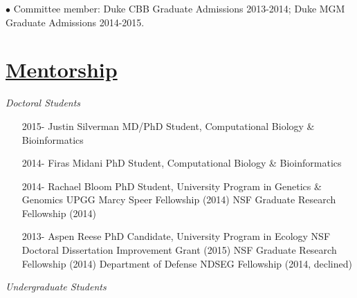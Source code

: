 \documentclass[overlapped,line,11pt]{res}
\begin{document}
\begin{resume}
\vspace{-10mm}
\hangindent=0.5in $\bullet$\hspace{.1in} Committee member: Duke CBB
Graduate Admissions 2013-2014; Duke MGM Graduate Admissions 2014-2015.


\section{\underline{\sc Mentorship}}
\vspace{.1in}
\emph{Doctoral Students}
\vspace{.1in}

\begin{itemize}[leftmargin=2cm, style=sameline, itemsep=0mm]

\item[2015-] Justin Silverman \newline 
  MD/PhD Student, Computational Biology \& Bioinformatics
\item[2014-] Firas Midani \newline 
  PhD Student, Computational Biology \& Bioinformatics
\item[2014-] Rachael Bloom \newline 
  PhD Student, University Program in Genetics \& Genomics \newline
  UPGG Marcy Speer Fellowship (2014) \newline
  NSF Graduate Research Fellowship (2014)
\item[2013-] Aspen Reese \newline 
  PhD Candidate, University Program in Ecology \newline
  NSF Doctoral Dissertation Improvement Grant (2015) \newline
  NSF Graduate Research Fellowship (2014) \newline
  Department of Defense NDSEG Fellowship (2014, declined)

\end{itemize}

\emph{Undergraduate Students}
\vspace{.1in}
\begin{itemize}[leftmargin=2cm, style=sameline, itemsep=0mm]


\end{itemize}
\end{resume}
\end{document}
